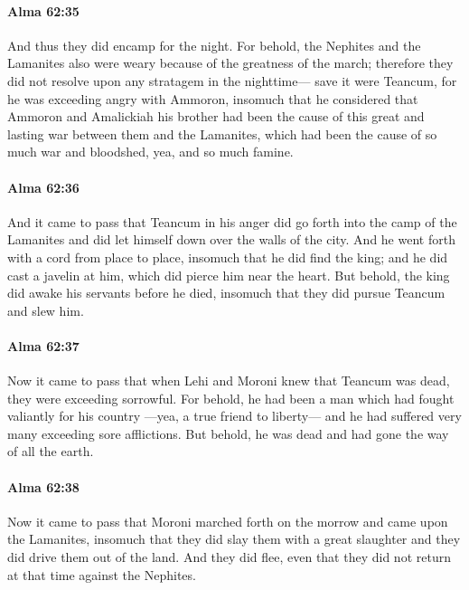 		\paragraph{Alma 62:35} %
			\label{ALMA-62-35}

			And thus they did encamp for the night.
			For behold, the Nephites and the Lamanites also were weary
			because of the greatness of the march;
			therefore they did not resolve upon any stratagem in the nighttime---
			save it were Teancum,
			for he was exceeding angry with Ammoron,
			insomuch that he considered that Ammoron and Amalickiah his brother
			had been the cause of this great and lasting war between them and the Lamanites,
			which had been the cause of so much war and bloodshed,
			yea, and so much famine.

		\paragraph{Alma 62:36} %
			\label{ALMA-62-36}

			And it came to pass that
			Teancum in his anger did go forth into the camp of the Lamanites
			and did let himself down over the walls of the city.
			And he went forth with a cord from place to place,
			insomuch that he did find the king;
			and he did cast a javelin at him, which did pierce him near the heart.
			But behold, the king did awake his servants before he died,
			insomuch that they did pursue Teancum and slew him.

		\paragraph{Alma 62:37} %
			\label{ALMA-62-37}

			Now it came to pass that
			when Lehi and Moroni knew that Teancum was dead,
			they were exceeding sorrowful.
			For behold, he had been a man which had fought valiantly for his country
			---yea, a true friend to liberty---
			and he had suffered very many exceeding sore afflictions.
			But behold, he was dead and had gone the way of all the earth.

		\paragraph{Alma 62:38} %
			\label{ALMA-62-38}

			Now it came to pass that
			Moroni marched forth on the morrow and came upon the Lamanites,
			insomuch that they did slay them with a great slaughter
			and they did drive them out of the land.
			And they did flee, even that they did not return at that time against the Nephites.

